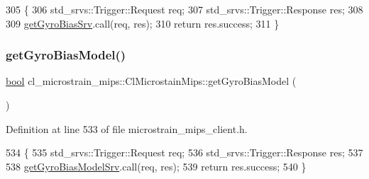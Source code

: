 \begin{DoxyCode}
305     \{
306         std\_srvs::Trigger::Request req;
307         std\_srvs::Trigger::Response res;
308 
309         \hyperlink{classcl__microstrain__mips_1_1ClMicrostainMips_a2f3eaec7f31a54d833773ebb5eb03b64}{getGyroBiasSrv}.call(req, res);
310         \textcolor{keywordflow}{return} res.success;
311     \}
\end{DoxyCode}
\mbox{\label{classcl__microstrain__mips_1_1ClMicrostainMips_a9a4353f87640e524750cf919bdcdbf2d}} 
\subsubsection{\texorpdfstring{get\+Gyro\+Bias\+Model()}{getGyroBiasModel()}}
{\footnotesize\ttfamily \hyperlink{classbool}{bool} cl\+\_\+microstrain\+\_\+mips\+::\+Cl\+Microstain\+Mips\+::get\+Gyro\+Bias\+Model (\begin{DoxyParamCaption}{ }\end{DoxyParamCaption})\hspace{0.3cm}{\ttfamily [inline]}}



Definition at line 533 of file microstrain\+\_\+mips\+\_\+client.\+h.


\begin{DoxyCode}
534     \{
535         std\_srvs::Trigger::Request req;
536         std\_srvs::Trigger::Response res;
537 
538         \hyperlink{classcl__microstrain__mips_1_1ClMicrostainMips_a4caf935b9d839aa586b562982cfc3adb}{getGyroBiasModelSrv}.call(req, res);
539         \textcolor{keywordflow}{return} res.success;
540     \}
\end{DoxyCode}
\mbox{\label{classcl__microstrain__mips_1_1ClMicrostainMips_a7e54b1b4fb3ccdc5d2a845e52caf2f17}} 
